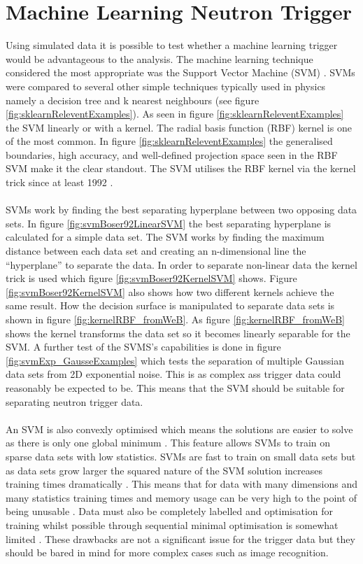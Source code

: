 \section{Machine Learning Neutron Trigger}\label{sec:MachineLearningTrigger}
Using simulated data it is possible to test whether a machine learning trigger would be advantageous to the analysis. The machine learning technique considered the most appropriate was the Support Vector Machine (SVM) \cite{Boser92atraining} \cite{cortes1995support}. SVMs were compared to several other simple techniques typically used in physics namely a decision tree and k nearest neighbours (see figure \ref{fig:sklearnReleventExamples}). As seen in figure \ref{fig:sklearnReleventExamples} the SVM linearly or with a kernel. The radial basis function (RBF) kernel is one of the most common. In figure \ref{fig:sklearnReleventExamples} the generalised boundaries, high accuracy, and well-defined projection space seen in the RBF SVM make it the clear standout. The SVM utilises the RBF kernel via the kernel trick since at least 1992 \cite{Boser92atraining}. 
\\\\SVMs work by finding the best separating hyperplane between two opposing data sets. In figure \ref{fig:svmBoser92LinearSVM} the best separating hyperplane is calculated for a simple data set. The SVM works by finding the maximum distance between each data set and creating an n-dimensional line the ``hyperplane'' to separate the data. In order to separate non-linear data the kernel trick is used which figure \ref{fig:svmBoser92KernelSVM} shows. Figure \ref{fig:svmBoser92KernelSVM} also shows how two different kernels achieve the same result. How the decision surface is manipulated to separate data sets is shown in figure \ref{fig:kernelRBF_fromWeB}. As figure \ref{fig:kernelRBF_fromWeB} shows the kernel transforms the data set so it becomes linearly separable for the SVM. A further test of the SVMS's capabilities is done in figure \ref{fig:svmExp_GausseExamples} which tests the separation of multiple Gaussian data sets from 2D exponential noise. This is as complex ass trigger data could reasonably be expected to be. This means that the SVM should be suitable for separating neutron trigger data. 
\\\\An SVM is also convexly optimised which means the solutions are easier to solve as there is only one global minimum \cite{cortes1995support}. This feature allows SVMs to train on sparse data sets with low statistics. SVMs are fast to train on small data sets but as data sets grow larger the squared nature of the SVM solution increases training times dramatically \cite{cortes1995support}. This means that for data with many dimensions and many statistics training times and memory usage can be very high to the point of being unusable \cite{cortes1995support}. Data must also be completely labelled and optimisation for training whilst possible through sequential minimal optimisation is somewhat limited \cite{platt1998sequential}. These drawbacks are not a significant issue for the trigger data but they should be bared in mind for more complex cases such as image recognition.
 

